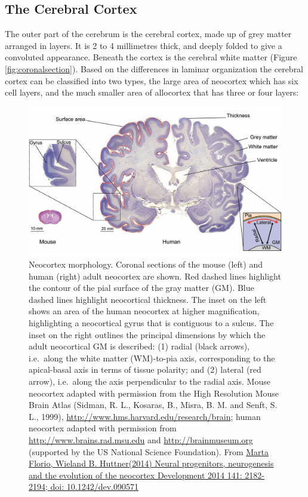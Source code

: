 \hypertarget{the-cerebral-cortex}{%
\subsection{The Cerebral Cortex}\label{the-cerebral-cortex}}

The outer part of the cerebrum is the cerebral cortex, made up of grey matter arranged in layers. It is 2 to 4 millimetres thick, and deeply folded to give a convoluted appearance. Beneath the cortex is the cerebral white matter (Figure \ref{fig:coronalsection}). Based on the differences in laminar organization the cerebral cortex can be classified into two types, the large area of neocortex which has six cell layers, and the much smaller area of allocortex that has three or four layers:



\begin{figure}

{\centering \includegraphics[width=0.7\linewidth]{./figures/cns/cortex_morphology} 

}

\caption{Neocortex morphology. Coronal sections of the mouse (left) and human (right) adult neocortex are shown. Red dashed lines highlight the contour of the pial surface of the gray matter (GM). Blue dashed lines highlight neocortical thickness. The inset on the left shows an area of the human neocortex at higher magnification, highlighting a neocortical gyrus that is contiguous to a sulcus. The inset on the right outlines the principal dimensions by which the adult neocortical GM is described: (1) radial (black arrows), i.e.~along the white matter (WM)-to-pia axis, corresponding to the apical-basal axis in terms of tissue polarity; and (2) lateral (red arrow), i.e.~along the axis perpendicular to the radial axis. Mouse neocortex adapted with permission from the High Resolution Mouse Brain Atlas (Sidman, R. L., Kosaras, B., Misra, B. M. and Senft, S. L., 1999), \url{http://www.hms.harvard.edu/research/brain}; human neocortex adapted with permission from \url{http://www.brains.rad.msu.edu} and \url{http://brainmuseum.org} (supported by the US National Science Foundation). From \href{https://dev.biologists.org/content/141/11/2182}{Marta Florio, Wieland B. Huttner(2014) Neural progenitors, neurogenesis and the evolution of the neocortex Development 2014 141: 2182-2194; doi: 10.1242/dev.090571}}\label{fig:cortexmorphology}
\end{figure}

